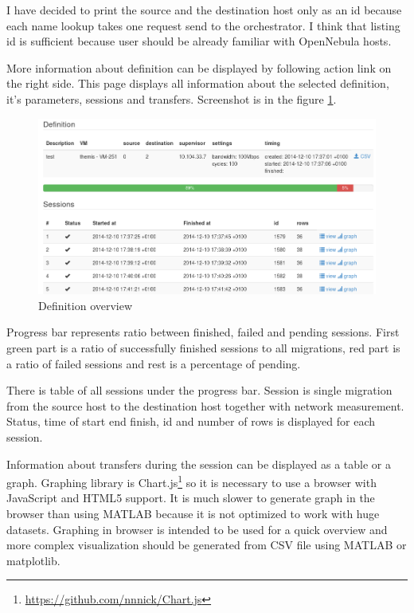I have decided to print the source and the destination host only as an id because each name lookup takes one request send to the orchestrator. I think that listing id is sufficient because user should be already familiar with OpenNebula hosts. 

More information about definition can be displayed by following  action link on the right side. This page displays all information about the selected definition, it's parameters, sessions and transfers. Screenshot is in the figure \ref{img:themis-definition}.

\begin{figure}[htb]
	\begin{center}
	\includegraphics[width=\textwidth]{themis-definition.png}
	\end{center}
	\caption{Definition overview}
	\label{img:themis-definition}
\end{figure}

Progress bar represents ratio between finished, failed and pending sessions. First green part is a ratio of successfully finished sessions to all migrations, red part is a ratio of failed sessions and rest is a percentage of pending. 

There is table of all sessions under the progress bar. Session is single migration from the source host to the destination host together with network measurement.
Status, time of start end finish, id and number of rows is displayed for each session.

Information about transfers during the session can be displayed as a table or a graph. Graphing library is Chart.js\footnote{\url{https://github.com/nnnick/Chart.js}} so it is necessary to use a browser with JavaScript and \Ac{HTML}5 support. It is much slower to generate graph in the browser than using MATLAB because it is not optimized to work with huge datasets. Graphing in browser is intended to be used for a quick overview and more complex visualization should be generated from \Ac{CSV} file using MATLAB or matplotlib.

